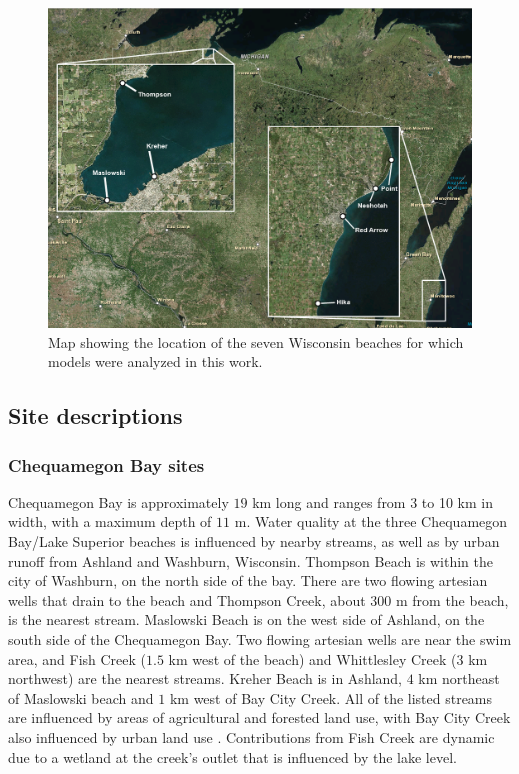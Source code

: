 \documentclass[authoryear,review, 12pt]{elsarticle}
\begin{document}
\begin{figure}
\includegraphics[width=\textwidth]{fig1/FIG1.png}
\caption{Map showing the location of the seven Wisconsin beaches for which models were analyzed in this work.
}
\end{figure}

\subsection{Site descriptions}\label{site-descriptions} 

\subsubsection{Chequamegon Bay sites}\label{chequamegon-bay-sites}

Chequamegon Bay is approximately \(19\) km long and ranges from 3 to 10
km in width, with a maximum depth of \(11\) m. Water quality at the
three Chequamegon Bay/Lake Superior beaches is influenced by nearby
streams, as well as by urban runoff from Ashland and Washburn,
Wisconsin. Thompson Beach is within the city of Washburn, on the
north side of the bay. There are two flowing artesian wells that drain
to the beach and Thompson Creek, about \(300\) m from the beach, is the
nearest stream. Maslowski Beach is on the west side of Ashland, on the
south side of the Chequamegon Bay. Two flowing artesian wells are near the swim area, and
Fish Creek (\(1.5\) km west of the beach) and Whittlesley Creek (\(3\)
km northwest) are the nearest streams. Kreher Beach is in Ashland, \(4\)
km northeast of Maslowski beach and \(1\) km west of Bay City Creek. All of the listed streams are influenced by
areas of agricultural and forested land use, with Bay City Creek also
influenced by urban land use \citep{Francy-et-al-2013}. Contributions
from Fish Creek are dynamic due to a wetland at the creek's outlet that
is influenced by the lake level.
\end{document}
